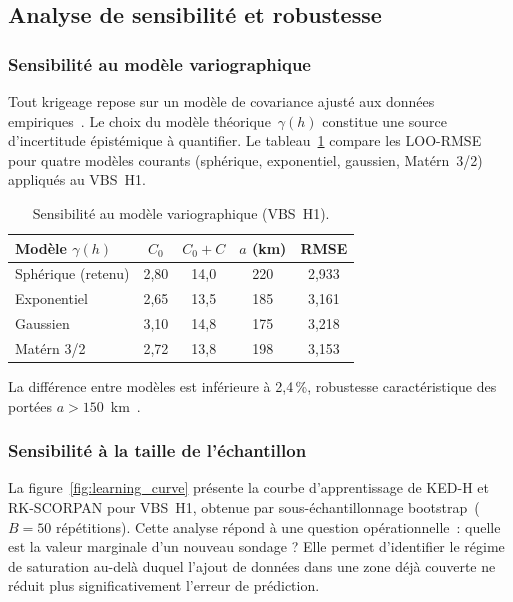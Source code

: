 \documentclass[10pt,a4paper,twocolumn]{article}
\begin{document}
	\subsection{Analyse de sensibilité et robustesse}
	\label{subsec:sensibilite}
	
	\subsubsection{Sensibilité au modèle variographique}

	Tout krigeage repose sur un modèle de covariance ajusté
	aux données empiriques~\cite{chilesdelfiner2012}.
	Le choix du modèle théorique~$\gamma(h)$ constitue
	une source d'incertitude épistémique à quantifier.
	Le tableau~\ref{tab:sensibilite_variogram} compare les
	LOO-RMSE pour quatre modèles courants (sphérique,
	exponentiel, gaussien, Matérn~3/2) appliqués au VBS~H1.

	\begin{table}[htbp]
		\centering\small
		\caption{Sensibilité au modèle variographique (VBS~H1).}
		\label{tab:sensibilite_variogram}
		\begin{tabular}{lcccc}
			\toprule
			Modèle $\gamma(h)$ & $C_0$ & $C_0+C$ & $a$ (km) & RMSE \\
			\midrule
			Sphérique (retenu) & 2,80 & 14,0 & 220 & 2,933 \\
			Exponentiel        & 2,65 & 13,5 & 185 & 3,161 \\
			Gaussien           & 3,10 & 14,8 & 175 & 3,218 \\
			Matérn 3/2         & 2,72 & 13,8 & 198 & 3,153 \\
			\bottomrule
		\end{tabular}
	\end{table}
	
	La différence entre modèles est inférieure à 2{,}4\,\%, robustesse
	caractéristique des portées $a>150$~km~\cite{lark2000kriging}.
	
	\subsubsection{Sensibilité à la taille de l'échantillon}

	La figure~\ref{fig:learning_curve} présente la courbe
	d'apprentissage de KED-H et RK-SCORPAN pour VBS~H1,
	obtenue par sous-échantillonnage bootstrap~($B=50$
	répétitions). Cette analyse répond à une question
	opérationnelle~: quelle est la valeur marginale d'un
	nouveau sondage ? Elle permet d'identifier le régime
	de saturation au-delà duquel l'ajout de données dans
	une zone déjà couverte ne réduit plus significativement
	l'erreur de prédiction.
\end{document}
